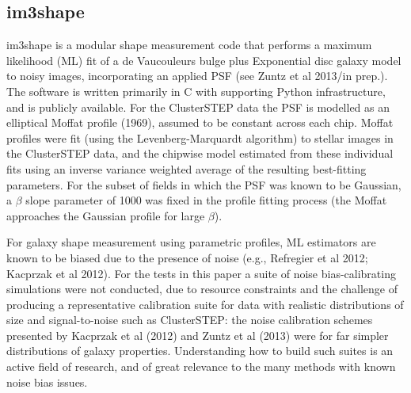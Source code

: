 \newpage 
\subsection{im3shape}
im3shape is a modular shape measurement code that performs a maximum likelihood (ML) fit of a de Vaucouleurs bulge plus Exponential disc galaxy model to noisy images, incorporating an applied PSF (see Zuntz et al 2013/in prep.).  The software is written primarily in C with supporting Python infrastructure, and is publicly available.  For the ClusterSTEP data the PSF is modelled as an elliptical Moffat profile (1969), assumed to be constant across each chip.  Moffat profiles were fit (using the Levenberg-Marquardt algorithm) to stellar images in the ClusterSTEP data, and the chipwise model estimated from these individual fits using an inverse variance weighted average of the resulting best-fitting parameters. For the subset of fields in which the PSF was known to be Gaussian, a $\beta$ slope parameter of 1000 was fixed in the profile fitting process (the Moffat approaches the Gaussian profile for large $\beta$).

For galaxy shape measurement using parametric profiles, ML estimators are known to be biased due to the presence of noise (e.g., Refregier et al 2012; Kacprzak et al 2012).  For the tests in this paper a suite of noise bias-calibrating simulations were not conducted, due to resource constraints and the challenge of producing a representative calibration suite for data with realistic distributions of size and signal-to-noise such as ClusterSTEP:  the noise calibration schemes presented by Kacprzak et al (2012) and Zuntz et al (2013) were for far simpler distributions of galaxy properties.  Understanding how to build such suites is an active field of research, and of great relevance to the many methods with known noise bias issues.


